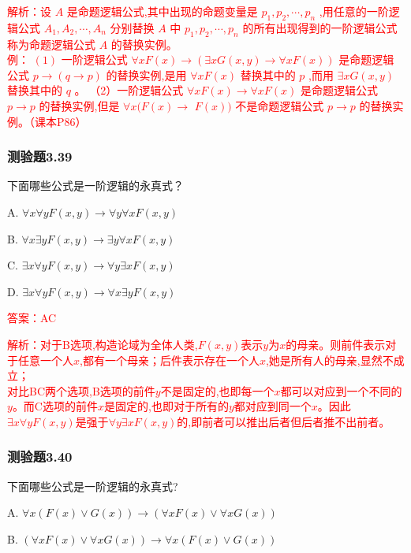 \documentclass[UTF8, heading=true]{ctexart}
\begin{document}
\textcolor{red}{解析：设 $A$ 是命题逻辑公式,其中出现的命题变量是 $p_1, p_2, \cdots, p_n$ ,用任意的一阶逻辑公式 $A_1, A_2, \cdots, A_n$ 分别替换 $A$ 中 $p_1, p_2, \cdots, p_n$ 的所有出现得到的一阶逻辑公式称为命题逻辑公式 $A$ 的替换实例。
\\例： $(1)$ 一阶逻辑公式 $\forall x F(x) \rightarrow(\exists x G(x, y) \rightarrow \forall x F(x))$ 是命题逻辑公式 $p \rightarrow(q \rightarrow p)$ 的替换实例,是用 $\forall x F(x)$ 替换其中的 $p$ ,而用 $\exists x G(x, y)$ 替换其中的 $q$ 。
（2）一阶逻辑公式 $\forall x F(x) \rightarrow \forall x F(x)$ 是命题逻辑公式 $p \rightarrow p$ 的替换实例,但是 $\forall x(F(x) \rightarrow$ $F(x))$ 不是命题逻辑公式 $p \rightarrow p$ 的替换实例。（课本P86）}
\subsubsection{测验题3.39}

下面哪些公式是一阶逻辑的永真式？

A. $ \forall x \forall y F(x, y) \rightarrow \forall y \forall x F(x, y)$

B. $\forall x \exists y F(x, y) \rightarrow \exists y \forall x F(x, y)$

C. $\exists x \forall y F(x, y) \rightarrow \forall y \exists x F(x, y)$

D. $ \exists x \forall y F(x, y) \rightarrow \forall x \exists y F(x, y)$

\textcolor{red}{答案：AC}

\textcolor{red}{解析：对于B选项,构造论域为全体人类,$F(x,y)$表示$y$为$x$的母亲。则前件表示对于任意一个人$x$,都有一个母亲；后件表示存在一个人$x$,她是所有人的母亲,显然不成立；
\\对比BC两个选项,B选项的前件$y$不是固定的,也即每一个$x$都可以对应到一个不同的$y$。而C选项的前件$x$是固定的,也即对于所有的$y$都对应到同一个$x$。因此$\exists x \forall y F(x, y)$是强于$\forall y \exists x F(x, y)$的,即前者可以推出后者但后者推不出前者。}

\subsubsection{测验题3.40}

下面哪些公式是一阶逻辑的永真式?

A. $
\forall x(F(x) \vee G(x)) \rightarrow(\forall x F(x) \vee \forall x G(x))
$

B. $
(\forall x F(x) \vee \forall x G(x)) \rightarrow \forall x(F(x) \vee G(x))
$
\end{document}
